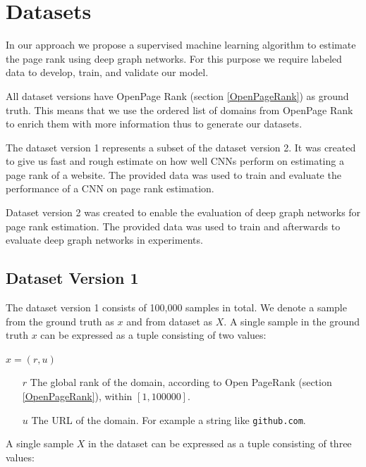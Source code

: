 \section{Datasets}
\label{datasets}
In our approach we propose a supervised machine learning algorithm to estimate the page rank using deep graph networks. For this purpose we require labeled data to develop, train, and validate our model.

All dataset versions have OpenPage Rank (section \ref{OpenPageRank}) as ground truth. This means that we use the ordered list of domains from OpenPage Rank to enrich them with more information thus to generate our datasets.

The dataset version 1 represents a subset of the dataset version 2. It was created to give us fast and rough estimate on how well CNNs perform on estimating a page rank of a website. The provided data was used to train and evaluate the performance of a CNN on page rank estimation. 

Dataset version 2 was created to enable the evaluation of deep graph networks for page rank estimation. The provided data was used to train and afterwards to evaluate deep graph networks in experiments. 

\subsection{Dataset Version 1}
\label{DatasetVersion1}
The dataset version 1 consists of 100,000 samples in total. We denote a sample from the ground truth as $x$ and from dataset as $X$. A single sample in the ground truth $x$ can be expressed as a tuple consisting of two values:

\begin{center}
	$x  = (r, u)$
	\begin{itemize}
		\item[$r$] The global rank of the domain, according to Open PageRank (section \ref{OpenPageRank}), within $[1, 100000]$. 
		\item[$u$] The URL of the domain. For example a string like \texttt{github.com}.
	\end{itemize}
\end{center}

A single sample $X$ in the dataset can be expressed as a tuple consisting of three values:

